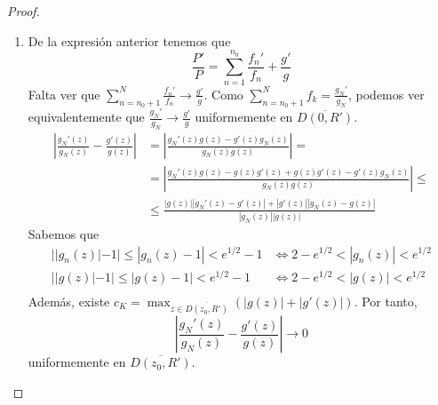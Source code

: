 \begin{proof}
\begin{enumerate}
        \item De la expresión anterior tenemos que
              $$\frac{P'}{P} = \sum_{n=1}^{n_0} \frac{f_n'}{f_n} + \frac{g'}{g}$$
              Falta ver que $\sum_{n=n_0+1}^N \frac{f_n'}{f_n} \to \frac{g'}{g}$.
              Como $\sum_{n=n_0+1}^N f_k = \frac{g_N'}{g_N}$, podemos ver equivalentemente que $\frac{g_N'}{g_N} \to \frac{g'}{g}$ uniformemente en $\overline{D(0, R')}$.
              \begin{align*}
                  \left|\frac{g_N'(z)}{g_N(z)} - \frac{g'(z)}{g(z)}\right| & = \left|\frac{g_N'(z)g(z)-g'(z)g_N(z)}{g_N(z)g(z)}\right| =                              \\
                                                                           & = \left|\frac{g_N'(z)g(z) - g(z)g'(z) + g(z)g'(z) - g'(z)g_N(z)}{g_N(z)g(z)}\right| \leq \\
                                                                           & \leq \frac{|g(z)||g_N'(z)-g'(z)| + |g'(z)||g_N(z)-g(z)|}{|g_N(z)||g(z)|}
              \end{align*}
              Sabemos que
              \begin{align*}
                  ||g_n(z)|-1| \leq |g_n(z)-1| < e^{1/2}-1 & \Leftrightarrow 2-e^{1/2} < |g_n(z)| < e^{1/2} \\
                  ||g(z)|-1| \leq |g(z)-1| < e^{1/2}-1     & \Leftrightarrow 2-e^{1/2} < |g(z)| < e^{1/2}   \\
              \end{align*}
              Además, existe $c_K = \max_{z \in \overline{D(z_0, R')}} (|g(z)|+|g'(z)|)$.
              Por tanto,
              $$\left|\frac{g_N'(z)}{g_N(z)}-\frac{g'(z)}{g(z)}\right| \to 0$$
              uniformemente en $\overline{D(z_0, R')}$.
    \end{enumerate}
\end{proof}

